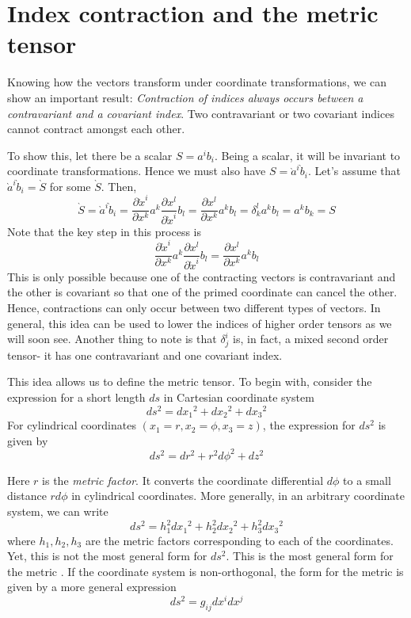 \documentclass[11pt, letterpaper]{article}
\newcommand{\dl}{\delta}
\newcommand{\mdij}{\delta^i_j}
\newcommand{\1}{\bm{1}}
\newcommand{\pd}[2]{\frac{\partial #1}{\partial #2}}
\newcommand{\p}[1]{\grave{#1}} %
\begin{document}
\section{Index contraction and the metric tensor}
Knowing how the vectors transform under coordinate transformations, we can show an important result: \textit{Contraction of indices always occurs between a contravariant and a covariant index}. Two contravariant or two covariant indices cannot contract amongst each other.

To show this, let there be a scalar $S=a^ib_i$. Being a scalar, it will be invariant to coordinate transformations. Hence we must also have $S=\p a^i\p b_i$. Let's assume that $\p a^i\p b_i=\p S$ for some $\p S$. Then, 
$$
\p S=\p a^i\p b_i=\pd{\p x^i}{x^k}a^k\pd{x^l}{\p x^i}b_l=\pd{x^l}{x^k}a^k b_l=\dl^l_k a^k b_l = a^kb_k = S
$$
Note that the key step in this process is
$$
\pd{\p x^i}{x^k}a^k\pd{x^l}{\p x^i}b_l=\pd{x^l}{x^k}a^k b_l
$$
This is only possible because one of the contracting vectors is contravariant and the other is covariant so that one of the primed coordinate can cancel the other. Hence, contractions can only occur between two different types of vectors. In general, this idea can be used to lower the indices of higher order tensors as we will soon see. Another thing to note is that $\mdij$ is, in fact, a mixed second order tensor- it has one contravariant and one covariant index.

This idea allows us to define the metric tensor. To begin with, consider the expression for a short length $ds$ in Cartesian coordinate system
$$
ds^2= d{x_1}^2+d{x_2}^2+d{x_3}^2 
$$
For cylindrical coordinates $(x_1=r, x_2=\phi, x_3=z)$, the expression for $ds^2$ is given by
$$
ds^2= d{r}^2+r^2d{\phi}^2+d{z}^2
$$

Here $r$ is the \textit{metric factor}. It converts the coordinate differential $d\phi$ to a small distance $r d\phi$ in cylindrical coordinates. More generally, in an arbitrary coordinate system, we can write
$$
ds^2= h_1^2d{x_1}^2 + h_2^2d{x_2}^2 + h_3^2d{x_3}^2 
$$
where $h_1,h_2,h_3$ are the metric factors corresponding to each of the coordinates. Yet, this is not the most general form for $ds^2$. This is the most general form for the metric . If the coordinate system is non-orthogonal, the form for the metric is given by a more general expression
$$
ds^2 = g_{ij}dx^idx^j
$$
\end{document}
